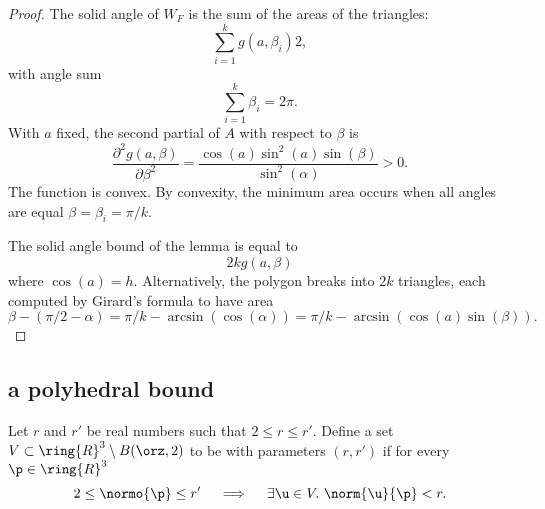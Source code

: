 \begin{proof}
The solid angle of $W_F$ is the sum of the areas of the triangles:
\begin{displaymath} 
\sum_{i=1}^k g(a,\beta_i) 2,
\end{displaymath}
with angle sum
\begin{displaymath} 
\sum_{i=1}^k \beta_i = 2\pi.
\end{displaymath}
With  $a$ fixed, the second partial of $A$ with respect to $\beta$ is
\begin{displaymath} 
\frac{\partial^2 g(a,\beta)}{\partial \beta^2} = 
\frac{\cos(a)\sin^2(a)\sin(\beta)}{\sin^2(\alpha)} > 0.
\end{displaymath}
The function is convex.
By convexity, the minimum area occurs when all angles are equal
$\beta=\beta_i = \pi/k$.

The solid angle bound of the lemma is equal to 
\begin{displaymath} 
2 k g(a,\beta)
\end{displaymath}
where $\cos(a)=h$.  Alternatively, the polygon breaks into $2k$
triangles, each computed by Girard's formula to have area
\begin{displaymath} 
\beta - (\pi/2 - \alpha)  = \pi/k - \arcsin(\cos(\alpha)) = 
\pi/k - \arcsin(\cos(a)\sin(\beta)).
\end{displaymath}
\end{proof}




\subsection{a polyhedral bound}

\begin{definition} 
\label{def:weakly-saturated}
Let $r$ and $r'$ be real numbers such that $2\le r\le r'$.  Define a
set $ V\subset\ring{R}^3\setminus B(\orz,2)$ to be  with
parameters $(r,r')$ if for every $\p\in\ring{R}^3$
\begin{displaymath} 
2\le\normo{\p}\le r'~~~\implies~~~ \exists \u\in V.~\norm{ \u}{\p}< r.
\end{displaymath}
\end{definition}


